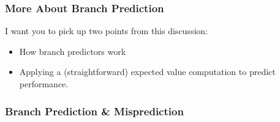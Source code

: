 \begin{frame}
\frametitle{More About Branch Prediction}

I want you to pick up two points from this discussion:

\begin{itemize}
\item How branch predictors work
\item Applying a (straightforward) expected value computation to predict performance.
\end{itemize}



\end{frame}


\begin{frame}[fragile]
\frametitle{Branch Prediction \& Misprediction}


\end{frame}
